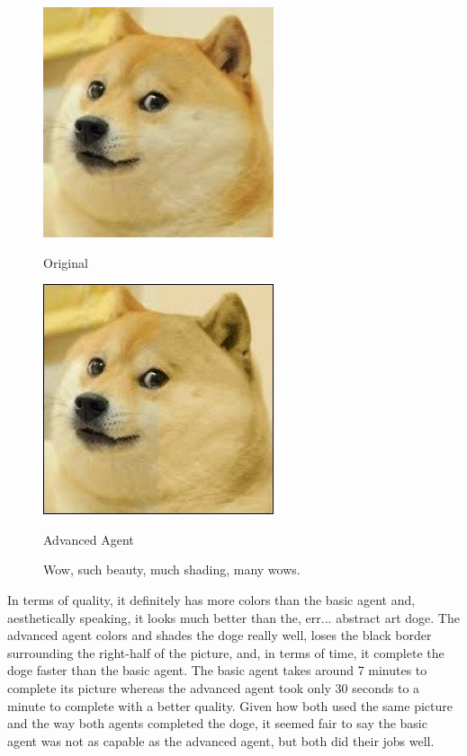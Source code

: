 \documentclass[11pt]{article}
\begin{document}
\begin{figure}[h]
\begin{minipage}[c]{0.5\textwidth}
\centering
\includegraphics[scale=0.94]{images/smolDoge.jpg}
\begin{center}
Original
\end{center}
\end{minipage}
\begin{minipage}[c]{0.5\textwidth}
\centering
\includegraphics[scale=0.70]{images/advanced.jpg}
\begin{center}
Advanced Agent
\end{center}
\end{minipage}
\caption{Wow, such beauty, much shading, many wows.}
\end{figure}

In terms of quality, it definitely has more colors than the basic agent and, aesthetically speaking, it looks much better than the, err... abstract art doge. The advanced agent colors and shades the doge really well, loses the black border surrounding the right-half of the picture, and, in terms of time, it complete the doge faster than the basic agent. The basic agent takes around 7 minutes to complete its picture whereas the advanced agent took only 30 seconds to a minute to complete with a better quality. Given how both used the same picture and the way both agents completed the doge, it seemed fair to say the basic agent was not as capable as the advanced agent, but both did their jobs well.
\end{document}
